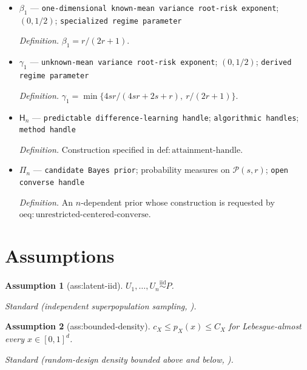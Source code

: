 \documentclass{article}
\newtheorem{assumption}{Assumption}
\begin{document}
\begin{itemize}
  \par\smallskip\noindent\emph{Definition.} \(\alpha_1=s/(2s+1)\).
  \item \(\beta_1\) --- \texttt{one-\allowbreak{}dimensional known-\allowbreak{}mean variance root-\allowbreak{}risk exponent}; \((0,1/2)\); \texttt{specialized regime parameter}
  \par\smallskip\noindent\emph{Definition.} \(\beta_1=r/(2r+1)\).
  \item \(\gamma_1\) --- \texttt{unknown-\allowbreak{}mean variance root-\allowbreak{}risk exponent}; \((0,1/2)\); \texttt{derived regime parameter}
  \par\smallskip\noindent\emph{Definition.} \(\gamma_1=\min\{4sr/(4sr+2s+r),\ r/(2r+1)\}\).
  \item \(\mathsf H_n\) --- \texttt{predictable difference-\allowbreak{}learning handle}; \texttt{algorithmic handles}; \texttt{method handle}
  \par\smallskip\noindent\emph{Definition.} Construction specified in \(\mathrm{def{:}attainment\text{-}handle}\).
  \item \(\Pi_n\) --- \texttt{candidate Bayes prior}; probability measures on \(\mathcal P(s,r)\); \texttt{open converse handle}
  \par\smallskip\noindent\emph{Definition.} An \(n\)-dependent prior whose construction is requested by \(\mathrm{oeq{:}unrestricted\text{-}centered\text{-}converse}\).
\end{itemize}

\section{Assumptions}

\begin{assumption}[ass:latent-iid]\label{ass:latent-iid}
\(U_1,\ldots,U_n\stackrel{\mathrm{iid}}{\sim}P\).
\par\smallskip\noindent\emph{Standard} (independent superpopulation sampling, \cite{LiSimchiLevi2026SequentialEfficiency}).
\end{assumption}

\begin{assumption}[ass:bounded-density]\label{ass:bounded-density}
\(c_X\le p_X(x)\le C_X\) for Lebesgue-almost every \(x\in[0,1]^d\).
\par\smallskip\noindent\emph{Standard} (random-design density bounded above and below, \cite{ShenGaoWittenHan2020Variance}).
\end{assumption}
\end{document}
